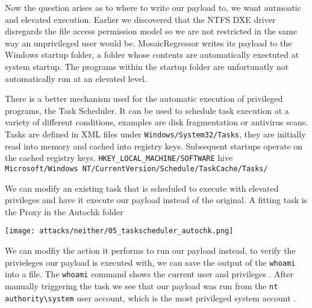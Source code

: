 
Now the question arises as to where to write our payload to, we want autmoatic and elevated execution. Earlier we discovered that the NTFS DXE driver disregards the file access permission model so we are not restricted in the same way an unprivileged user would be. MosaicRegressor writes its payload to the Windows startup folder, a folder whose contents are automatically exectuted at system startup. The programs within the startup folder are unfortunatly not automatically run at an elevated level.



There is a better mechanism used for the automatic execution of privileged programs, the Task Scheduler. It can be used to schedule task execution at a variety of different conditions, examples are disk fragmentation or antivirus scans.
Tasks are defined in XML files under \lstinline{Windows/System32/Tasks}, they are initially read into memory and cached into registry keys. Subsequent startups operate on the cached registry keys.
\lstinline{HKEY_LOCAL_MACHINE/SOFTWARE} hive
\lstinline{Microsoft/Windows NT/CurrentVersion/Schedule/TaskCache/Tasks/}

\cite{windows-internals-7-part2}

We can modify an existing task that is scheduled to execute with elevated privileges and have it execute our payload instead of the original. A fitting task is the Proxy in the Autochk folder

\texttt{[image: attacks/neither/05\_taskscheduler\_autochk.png]}

We can modfiy the action it performs to run our payload instead, to verify the privieleges our payload is executed with, we can save the output of the \lstinline{whoami} into a file. The \lstinline{whoami} command shows the current user and privileges \cite{windows-whoami}. After manually triggering the task we see that our payload was run from the \lstinline{nt authority\system} user account, which is the most privileged system account \cite{microsoft-localsystem-account}.

